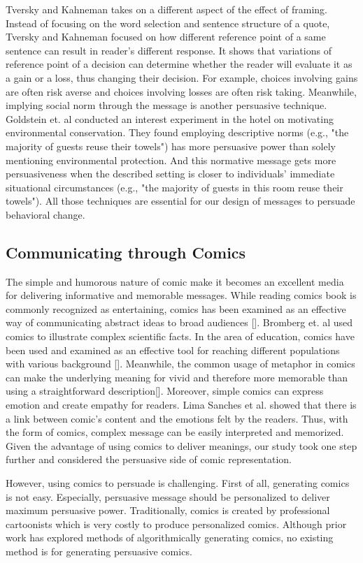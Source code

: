 Tversky and Kahneman takes on a different aspect of the effect of framing. Instead of focusing on the word selection and sentence structure of a quote, Tversky and Kahneman focused on how different reference point of a same sentence can result in reader's different response. It shows that variations of reference point of a decision can determine whether the reader will evaluate it as a gain or a loss, thus changing their decision. For example, choices involving gains are often risk averse and choices involving losses are often risk taking. Meanwhile, implying social norm through the message is another persuasive technique.  Goldstein et. al conducted an interest experiment in the hotel on motivating environmental conservation. They found employing descriptive norms (e.g., "the majority of guests reuse their towels") has more persuasive power than solely mentioning environmental protection. And this normative message gets more persuasiveness when the described setting is closer to individuals' immediate situational circumstances (e.g., "the majority of guests in this room reuse their towels").  All those techniques are essential for our design of messages to persuade behavioral change.\par


\subsection{Communicating through Comics}
The simple and humorous nature of comic make it becomes an excellent media for delivering informative and memorable messages. While reading comics book is commonly recognized as entertaining, comics has been examined as an effective way of communicating abstract ideas to broad audiences []. Bromberg et. al used comics to illustrate complex scientific facts. In the area of education, comics have been used and examined as an effective tool for reaching different populations with various background []. Meanwhile, the common usage of metaphor in comics can make the underlying meaning for vivid and therefore more memorable than using a straightforward description[]. Moreover, simple comics can express emotion and create empathy for readers. Lima Sanches et al. showed that there is a link between comic’s content and the emotions felt by the readers. Thus, with the form of comics, complex message can be easily interpreted and memorized. Given the advantage of using comics to deliver meanings, our study took one step further and considered the persuasive side of comic representation. \par

However, using comics to persuade is challenging. First of all, generating comics is not easy. Especially, persuasive message should be personalized to deliver maximum persuasive power. Traditionally, comics is created by professional cartoonists which is very costly to produce personalized comics.  Although prior work has explored methods of algorithmically generating comics, no existing method is for generating persuasive comics. \par
